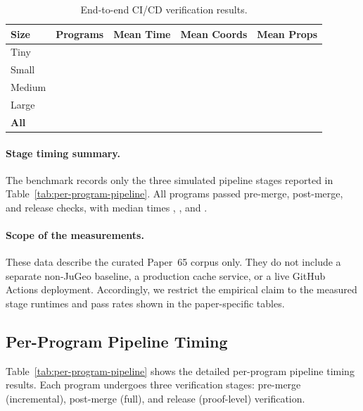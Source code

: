 \documentclass[11pt]{article}
\begin{document}
\begin{table}[t]
\centering
\caption{End-to-end CI/CD verification results.}
\label{tab:cicd-results}
\begin{tabular}{lrrrr}
\toprule
\textbf{Size} & \textbf{Programs} & \textbf{Mean Time} &
  \textbf{Mean Coords} & \textbf{Mean Props} \\
\midrule
Tiny   & \compTinyCount{}   & \compTinyMeanTime{}   &
  \compTinyMeanCoords{}   & \compTinyMeanProps{} \\
Small  & \compSmallCount{}  & \compSmallMeanTime{}  &
  \compSmallMeanCoords{}  & \compSmallMeanProps{} \\
Medium & \compMediumCount{} & \compMediumMeanTime{} &
  \compMediumMeanCoords{} & \compMediumMeanProps{} \\
Large  & \compLargeCount{}  & \compLargeMeanTime{}  &
  \compLargeMeanCoords{}  & \compLargeMeanProps{} \\
\midrule
\textbf{All} & \compTotalPrograms{} & \compTimeMean{} &
  \compCoordsMean{} & \compPropsMean{} \\
\bottomrule
\end{tabular}
\end{table}

\paragraph{Stage timing summary.}
The benchmark records only the three simulated pipeline stages reported in
Table~\ref{tab:per-program-pipeline}. All \ppLXVprogramCount{} programs passed
pre-merge, post-merge, and release checks, with median times
\ppLXVpreMedian{}, \ppLXVpostMedian{}, and \ppLXVreleaseMedian{}.

\paragraph{Scope of the measurements.}
These data describe the curated Paper~65 corpus only. They do not include a
separate non-JuGeo baseline, a production cache service, or a live GitHub
Actions deployment. Accordingly, we restrict the empirical claim to the
measured stage runtimes and pass rates shown in the paper-specific tables.

\subsection{Per-Program Pipeline Timing}

Table~\ref{tab:per-program-pipeline} shows the detailed per-program pipeline
timing results. Each program undergoes three verification stages: pre-merge
(incremental), post-merge (full), and release (proof-level) verification.
\end{document}
